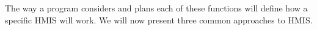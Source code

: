 The way a program considers and plans each of these functions will define how a specific HMIS will work. We will now present three common approaches to HMIS.






